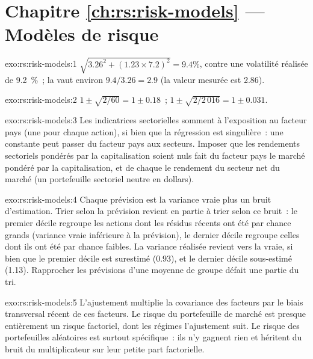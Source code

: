 \section*{Chapitre \ref{ch:rs:risk-models} --- Modèles de risque}

\begin{solution}{exo:rs:risk-models:1}
$\sqrt{3.26^2 + (1.23 \times 7.2)^2} = 9.4\%$, contre une volatilité réalisée de 9.2~\%~; la  vaut environ $9.4/3.26 = 2.9$ (la valeur mesurée est 2.86).
\end{solution}

\begin{solution}{exo:rs:risk-models:2}
$1 \pm \sqrt{2/60} = 1 \pm 0.18$~; $1 \pm \sqrt{2/2\,016} = 1 \pm 0.031$.
\end{solution}

\begin{solution}{exo:rs:risk-models:3}
Les indicatrices sectorielles somment à l'exposition au facteur pays (une pour chaque action), si bien que la régression est singulière~: une constante peut passer du facteur pays
aux secteurs. Imposer que les rendements sectoriels pondérés par la capitalisation soient nuls fait du facteur pays le marché pondéré par la capitalisation, et de chaque 
le rendement du secteur net du marché (un portefeuille sectoriel neutre en dollars).
\end{solution}

\begin{solution}{exo:rs:risk-models:4}
Chaque prévision est la variance vraie plus un bruit d'estimation. Trier selon la prévision revient en partie à trier selon ce bruit~: le premier décile regroupe les actions dont les résidus récents
ont été par chance grands (variance vraie inférieure à la prévision), le dernier décile regroupe celles dont ils ont été par chance faibles. La variance réalisée revient vers la vraie, si bien que le premier décile est surestimé
(0.93), et le dernier décile sous-estimé (1.13). Rapprocher les prévisions d'une moyenne de groupe défait une partie du tri.
\end{solution}

\begin{solution}{exo:rs:risk-models:5}
L'ajustement multiplie la covariance des facteurs par le biais transversal récent de ces facteurs. Le risque du portefeuille de marché est presque entièrement un risque factoriel, dont les régimes
l'ajustement suit. Le risque des portefeuilles aléatoires est surtout spécifique~: ils n'y gagnent rien et héritent du bruit du multiplicateur sur leur petite part factorielle.
\end{solution}


